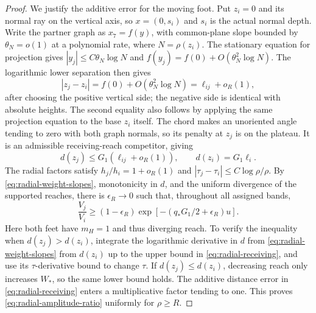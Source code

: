 \begin{proof}
We justify the additive error for the moving foot. Put $z_i=0$ and
its normal ray on the vertical axis, so $x=(0,s_i)$ and $s_i$ is the
actual normal depth. Write the partner graph as $x_7=f(y)$, with
common-plane slope bounded by $\theta_N=o(1)$ at a polynomial rate,
where $N=\rho(z_i)$. The stationary equation for projection gives
$|y_j|\le C\theta_N\log N$ and
$f(y_j)=f(0)+O(\theta_N^2\log N)$. The logarithmic lower separation
then gives
\[
 |z_j-z_i|=f(0)+O(\theta_N^2\log N)
          =\ell_{ij}+o_R(1),
\]
after choosing the positive vertical side; the negative side is
identical with absolute heights. The second equality also follows by
applying the same projection equation to the base $z_i$ itself.
The chord makes an unoriented angle tending to zero with both graph
normals, so its
penalty at $z_j$ is on the plateau. It is an admissible receiving-reach
competitor, giving
\begin{equation}\label{eq:radial-receiving}
 d(z_j)\le G_1(\ell_{ij}+o_R(1)),\qquad d(z_i)=G_1\ell_i.
\end{equation}
The radial factors satisfy $h_j/h_i=1+o_R(1)$ and
$|\tau_j-\tau_i|\le C\log\rho/\rho$. By
\eqref{eq:radial-weight-slopes}, monotonicity in $d$, and the uniform divergence of the supported reaches, there is $\epsilon_R\to0$ such that, throughout all assigned bands,
\begin{equation}\label{eq:radial-amplitude-ratio}
 \frac{V_j}{V_i}\ge(1-\epsilon_R)
     \exp[-(q_*G_1/2+\epsilon_R)u].
\end{equation}
Here both feet have $m_H=1$ and thus diverging reach. To verify the inequality when $d(z_j)>d(z_i)$, integrate the logarithmic derivative in $d$ from \eqref{eq:radial-weight-slopes} from $d(z_i)$ up to the upper bound in \eqref{eq:radial-receiving}, and use its $\tau$-derivative bound to change $\tau$. If $d(z_j)\le d(z_i)$, decreasing reach only increases $W_*$, so the same lower bound holds. The additive distance error in \eqref{eq:radial-receiving} enters a multiplicative factor tending to one. This proves \eqref{eq:radial-amplitude-ratio} uniformly for $\rho\ge R$.


\end{proof}
